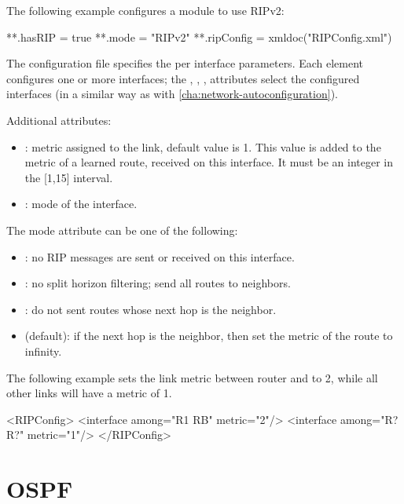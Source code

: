 The following example configures a  module to use RIPv2:

\begin{inifile}
**.hasRIP = true
**.mode = "RIPv2"
**.ripConfig = xmldoc("RIPConfig.xml")
\end{inifile}

The configuration file specifies the per interface parameters.
Each  element configures one or more interfaces;
the , , ,  attributes
select the configured interfaces (in a similar way as with
 \ref{cha:network-autoconfiguration}).

Additional attributes:

\begin{itemize}
  \item {}: metric assigned to the link, default value is 1.
        This value is added to the metric of a learned route,
        received on this interface. It must be an integer in
        the [1,15] interval.
  \item {}: mode of the interface.
\end{itemize}

The mode attribute can be one of the following:

\begin{itemize}
  \item {}: no RIP messages are sent or received on this interface.
  \item {}: no split horizon filtering; send all routes to
        neighbors.
  \item {}: do not sent routes whose next hop is the neighbor.
  \item {} (default): if the next hop is the neighbor, then
  set the metric of the route to infinity.
\end{itemize}

The following example sets the link metric between router
 and  to 2, while all other links will have a metric of 1.

\begin{XML}
<RIPConfig>
  <interface among="R1 RB" metric="2"/>
  <interface among="R? R?" metric="1"/>
</RIPConfig>
\end{XML}

\section{OSPF}
\label{sec:routing:ospf}

